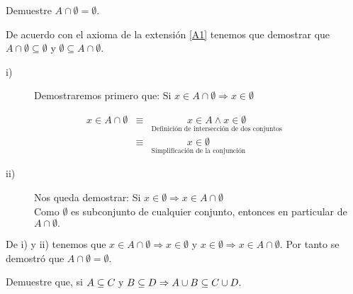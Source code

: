 \propo  Demuestre $A\cap\emptyset=\emptyset.$

\begin{prueba} De acuerdo con el axioma de la extensión \ref{A1}
tenemos que demostrar que $A\cap\emptyset\subseteq\emptyset$ y $\emptyset\subseteq A\cap\emptyset.$
\begin{description}
\item [{i)}] Demostraremos primero que: Si $x\in A\cap\emptyset\Rightarrow x\in\emptyset$
\end{description}
\begin{eqnarray*}
x\in A\cap\emptyset & \equiv & \underset{\mbox{Definición de intersección de dos conjuntos}}{x\in A\wedge x\in\emptyset}\\
 & \equiv & \underset{\mbox{Simplificación de la conjunción}}{x\in\emptyset}
\end{eqnarray*}

\begin{description}
\item [{ii)}] Nos queda demostrar: Si $x\in\emptyset\Rightarrow x\in A\cap\emptyset$\\[5pt]
Como $\emptyset$ es subconjunto de cualquier conjunto, entonces en
particular de $A\cap\emptyset.$
\end{description}
De i) y ii) tenemos que $x\in A\cap\emptyset\Rightarrow x\in\emptyset$
y $x\in\emptyset\Rightarrow x\in A\cap\emptyset.$ Por tanto se demostró
que $A\cap\emptyset=\emptyset.$

\end{prueba}

\propo  Demuestre que, si $A\subseteq C\mbox{ y \ensuremath{B\subseteq D\Rightarrow A\cup B\subseteq C\cup D}}.$

